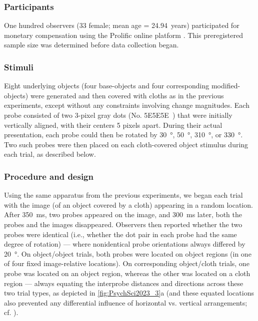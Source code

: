 \subsubsection{Participants}

One hundred observers (33 female; mean age = 24.94~years) participated for monetary compensation using the Prolific online platform \parencite{palan_prolificacsubject_2018}. This preregistered sample size was determined before data collection began.

\subsubsection{Stimuli}

Eight underlying objects (four base-objects and four corresponding modified-objects) were generated and then covered with cloths as in the previous experiments, except without any constraints involving change magnitudes. Each probe consisted of two 3-pixel gray dots (No. 5E5E5E~) that were initially vertically aligned, with their centers 5 pixels apart. During their actual presentation, each probe could then be rotated by \qty{30}{\degree}, \qty{50}{\degree}, \qty{310}{\degree}, or \qty{330}{\degree}. Two such probes were then placed on each cloth-covered object stimulus during each trial, as described below.

\subsubsection{Procedure and design}

Using the same apparatus from the previous experiments, we began each trial with the image (of an object covered by a cloth) appearing in a random location. After \qty{350}{\milli\second}, two probes appeared on the image, and \qty{300}{\milli\second} later, both the probes and the images disappeared. Observers then reported whether the two probes were identical (i.e., whether the dot pair in each probe had the same degree of rotation) --- where nonidentical probe orientations always differed by \qty{20}{\degree}. On object/object trials, both probes were located on object regions (in one of four fixed image-relative locations). On corresponding object/cloth trials, one probe was located on an object region, whereas the other was located on a cloth region --- always equating the interprobe distances and directions across these two trial types, as depicted in \cref{fig:PsychSci2023_3}a (and these equated locations also prevented any differential influence of horizontal vs. vertical arrangements; cf. \cite{chen_when_2019}).

